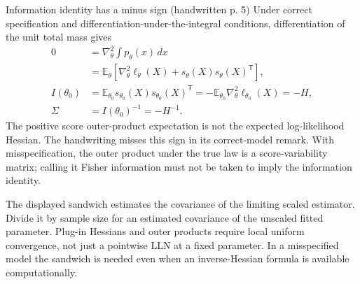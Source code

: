 \documentclass[12pt]{article}
\newcommand{\E}{\mathbb E}
\begin{document}
\begin{correctionbox}{Information identity has a minus sign (handwritten p. 5)}
Under correct specification and differentiation-under-the-integral
conditions, differentiation of the unit total mass gives
\begin{align}
 0&=\nabla_\theta^2\int p_\theta(x)\,dx\\
 &=\E_\theta\!\left[
 \nabla_\theta^2\ell_\theta(X)+s_\theta(X)s_\theta(X)^{\mathsf T}
 \right],\\
 I(\theta_0)&=\E_{\theta_0}s_{\theta_0}(X)s_{\theta_0}(X)^{\mathsf T}
 =-\E_{\theta_0}\nabla_\theta^2\ell_{\theta_0}(X)=-H,\\
 \Sigma&=I(\theta_0)^{-1}=-H^{-1}.
\end{align}
The positive score outer-product expectation is not the expected
log-likelihood Hessian. The handwriting misses this sign in its
correct-model remark. With misspecification, the outer product under the
true law is a score-variability matrix; calling it Fisher information must
not be taken to imply the information identity.
\end{correctionbox}
\begin{remarkbox}
The displayed sandwich estimates the covariance of the limiting scaled
estimator. Divide it by sample size for an estimated covariance of the
unscaled fitted parameter. Plug-in Hessians and outer products require
local uniform convergence, not just a pointwise LLN at a fixed parameter.
In a misspecified model the sandwich is needed even when an inverse-Hessian
formula is available computationally.
\end{remarkbox}
\end{document}
